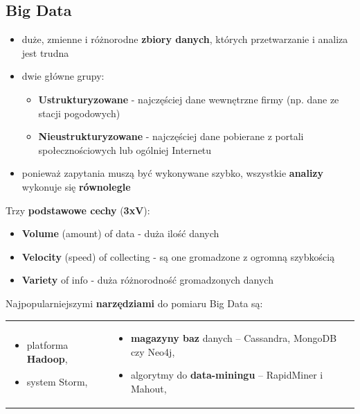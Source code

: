 \documentclass[a4paper]{article}
\begin{document}
    \subsection{Big Data}
    \begin{itemize}[noitemsep]
        \item duże, zmienne i różnorodne \textbf{zbiory danych}, których przetwarzanie i analiza jest trudna
        \item dwie główne grupy:
        \begin{itemize}[noitemsep]
            \item \textbf{Ustrukturyzowane} - najczęściej dane wewnętrzne firmy (np. dane ze stacji pogodowych)
            \item \textbf{Nieustrukturyzowane} - najczęściej dane pobierane z portali społecznościowych lub ogólniej
            Internetu
        \end{itemize}
        \item ponieważ zapytania muszą być wykonywane szybko, wszystkie \textbf{analizy} wykonuje się \textbf{równolegle}
    \end{itemize}

    Trzy \textbf{podstawowe cechy} (\textbf{3xV}):
    \begin{itemize}[noitemsep]
        \item \textbf{Volume} (amount) of data - duża ilość danych
        \item \textbf{Velocity} (speed) of collecting - są one gromadzone z ogromną szybkością
        \item \textbf{Variety} of info - duża różnorodność gromadzonych danych
    \end{itemize}

    Najpopularniejszymi \textbf{narzędziami} do pomiaru Big Data są:
    \begin{table}[H]
        \begin{center}
            \begin{tabular}{p{5cm} p{10cm}}
                \begin{itemize}[noitemsep]
                    \item platforma \textbf{Hadoop},
                    \item system Storm,
                \end{itemize}
                &
                \begin{itemize}[noitemsep]
                    \item \textbf{magazyny baz} danych – Cassandra, MongoDB czy Neo4j,
                    \item algorytmy do \textbf{data-miningu} – RapidMiner i Mahout,
                \end{itemize}
            \end{tabular}
        \end{center}
    \end{table}
\end{document}
